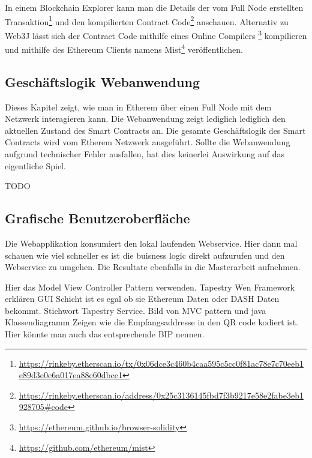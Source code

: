 In einem Blockchain Explorer kann man die Details der vom Full Node erstellten Transaktion\footnote{\url{https://rinkeby.etherscan.io/tx/0x06dce3c460b4caa595c5cc0f81ac78e7c70eeb1e89d3e0e6a017ea88e60dbce1}} und den kompilierten Contract Code\footnote{\url{https://rinkeby.etherscan.io/address/0x25c3136145fbd7f3b9217e58e2fabe3eb1928705\#code}} anschauen.
Alternativ zu Web3J lässt sich der Contract Code mithilfe eines Online Compilers \footnote{\url{https://ethereum.github.io/browser-solidity}} kompilieren und mithilfe des Ethereum Clients namens Mist\footnote{\url{https://github.com/ethereum/mist}} veröffentlichen.

\subsection{Geschäftslogik Webanwendung}

Dieses Kapitel zeigt, wie man in Etherem über einen Full Node mit dem Netzwerk interagieren kann. Die Webanwendung zeigt lediglich lediglich den aktuellen Zustand des Smart Contracts an. Die gesamte Geschäftslogik des Smart Contracts wird vom Etherem Netzwerk ausgeführt. Sollte die Webanwendung aufgrund  technischer Fehler ausfallen, hat dies keinerlei Auswirkung auf das eigentliche Spiel.

TODO 

\subsection{Grafische Benutzeroberfläche}


Die Webapplikation konsumiert den lokal laufenden Webservice. Hier dann mal schauen wie viel schneller es ist die buisness logic direkt aufzurufen und den Webservice zu umgehen. Die Resultate ebenfalls in die Masterarbeit aufnehmen.

    Hier das Model View Controller Pattern verwenden.
    Tapestry Wen Framework erklären
    GUI Schicht ist es egal ob sie Ethereum Daten oder DASH Daten bekommt. Stichwort Tapestry Service.
    Bild von MVC pattern und java Klassendiagramm
    Zeigen wie die Empfangsaddresse in den QR code kodiert ist. Hier könnte man auch das entsprechende BIP nennen.
